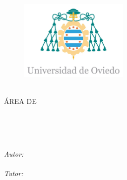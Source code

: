 \documentclass[
11pt, %
oneside, %
spanish, %
singlespacing, %
headsepline, %
]{MastersDoctoralThesis} %
\author{\href{https://www.linkedin.com/in/alex02}{D. Rodríguez López, Alejandro}}
\begin{document}
\frontmatter %

\pagestyle{plain} %


\begin{titlepage}
\begin{center}

\begin{figure}
	\begin{center}
	\includegraphics[width=200px]{Media/1-universidad-de-oviedo-22.png} %
	\end{center}
\end{figure}
\vspace{8em}
{\scshape\LARGE\facname\par} %

\vspace{2em}
\textsc{\Large \degreename{}}\\[0.5cm] %

\vspace{1em}
\textsc{\Large ÁREA DE\\\groupname{}}\\[0.5cm] %

\vspace{2em}
\HRule \\[0.4cm] %
{\huge \bfseries \ttitle\par}\vspace{0.4cm} %
\HRule \\[1.5cm] %
 
\begin{center}
	\large
	\emph{Autor:}\\
	\authorname\\
	\vspace{1em}
	\emph{Tutor:} \\
	\tutorName
\end{center}


\end{center}
\end{titlepage}
\end{document}
